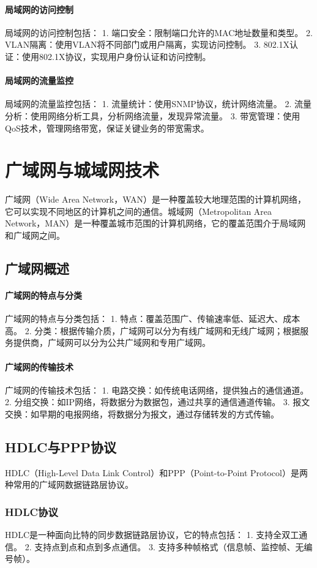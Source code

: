 \documentclass{book}
\begin{document}
\subsubsection{局域网的访问控制}
局域网的访问控制包括：
1. 端口安全：限制端口允许的MAC地址数量和类型。
2. VLAN隔离：使用VLAN将不同部门或用户隔离，实现访问控制。
3. 802.1X认证：使用802.1X协议，实现用户身份认证和访问控制。
\subsubsection{局域网的流量监控}
局域网的流量监控包括：
1. 流量统计：使用SNMP协议，统计网络流量。
2. 流量分析：使用网络分析工具，分析网络流量，发现异常流量。
3. 带宽管理：使用QoS技术，管理网络带宽，保证关键业务的带宽需求。

\chapter{广域网与城域网技术}
广域网（Wide Area Network，WAN）是一种覆盖较大地理范围的计算机网络，它可以实现不同地区的计算机之间的通信。城域网（Metropolitan Area Network，MAN）是一种覆盖城市范围的计算机网络，它的覆盖范围介于局域网和广域网之间。
\section{广域网概述}
\subsubsection{广域网的特点与分类}
广域网的特点与分类包括：
1. 特点：覆盖范围广、传输速率低、延迟大、成本高。
2. 分类：根据传输介质，广域网可以分为有线广域网和无线广域网；根据服务提供商，广域网可以分为公共广域网和专用广域网。
\subsubsection{广域网的传输技术}
广域网的传输技术包括：
1. 电路交换：如传统电话网络，提供独占的通信通道。
2. 分组交换：如IP网络，将数据分为数据包，通过共享的通信通道传输。
3. 报文交换：如早期的电报网络，将数据分为报文，通过存储转发的方式传输。
\section{HDLC与PPP协议}
HDLC（High-Level Data Link Control）和PPP（Point-to-Point Protocol）是两种常用的广域网数据链路层协议。
\subsection{HDLC协议}
HDLC是一种面向比特的同步数据链路层协议，它的特点包括：
1. 支持全双工通信。
2. 支持点到点和点到多点通信。
3. 支持多种帧格式（信息帧、监控帧、无编号帧）。
\end{document}
